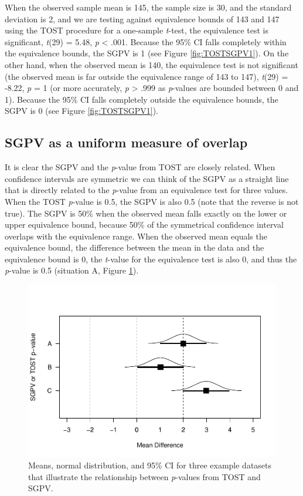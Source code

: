 \documentclass[,man,floatsintext]{apa6}
\begin{document}
When the observed sample mean is 145, the sample size is 30, and the standard deviation is 2, and we are testing against equivalence bounds of 143 and 147 using the TOST procedure for a one-sample \emph{t}-test, the equivalence test is significant, \emph{t}(29) = 5.48, \emph{p} \textless{} .001. Because the 95\% CI falls completely within the equivalence bounds, the SGPV is 1 (see Figure \ref{fig:TOSTSGPV1}).
On the other hand, when the observed mean is 140, the equivalence test is not significant (the observed mean is far outside the equivalence range of 143 to 147), \emph{t}(29) = -8.22, \emph{p} = 1 (or more accurately, \emph{p} \textgreater{} .999 as \emph{p}-values are bounded between 0 and 1). Because the 95\% CI falls completely outside the equivalence bounds, the SGPV is 0 (see Figure \ref{fig:TOSTSGPV1}).

\hypertarget{sgpv-as-a-uniform-measure-of-overlap}{%
\subsection{SGPV as a uniform measure of overlap}\label{sgpv-as-a-uniform-measure-of-overlap}}

It is clear the SGPV and the \emph{p}-value from TOST are closely related. When confidence intervals are symmetric we can think of the SGPV as a straight line that is directly related to the \emph{p}-value from an equivalence test for three values. When the TOST \emph{p}-value is 0.5, the SGPV is also 0.5 (note that the reverse is not true). The SGPV is 50\% when the observed mean falls exactly on the lower or upper equivalence bound, because 50\% of the symmetrical confidence interval overlaps with the equivalence range. When the observed mean equals the equivalence bound, the difference between the mean in the data and the equivalence bound is 0, the \emph{t}-value for the equivalence test is also 0, and thus the \emph{p}-value is 0.5 (situation A, Figure \ref{fig:TOSTSGPV3}).

\begin{figure}
\centering
\includegraphics{manuscript.R2_files/figure-latex/TOSTSGPV3-1.pdf}
\caption{\label{fig:TOSTSGPV3}Means, normal distribution, and 95\% CI for three example datasets that illustrate the relationship between \emph{p}-values from TOST and SGPV.}
\end{figure}
\end{document}

